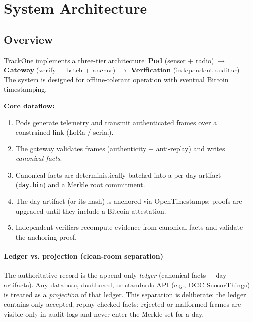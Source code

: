 \section{System Architecture}\label{sec:system-architecture}

\subsection{Overview}\label{subsec:overview}

TrackOne implements a three-tier architecture: \textbf{Pod} (sensor + radio) $\rightarrow$ \textbf{Gateway} (verify + batch + anchor) $\rightarrow$ \textbf{Verification} (independent auditor).
The system is designed for offline-tolerant operation with eventual Bitcoin timestamping.

\textbf{Core dataflow:}
\begin{enumerate}[nosep]
\item Pods generate telemetry and transmit authenticated frames over a constrained link (\ac{LoRa} / serial).
\item The gateway validates frames (authenticity + anti-replay) and writes \emph{canonical facts}.
\item Canonical facts are deterministically batched into a per-day artifact (\texttt{day.bin}) and a Merkle root commitment.
\item The day artifact (or its hash) is anchored via OpenTimestamps; proofs are upgraded until they include a Bitcoin attestation.
\item Independent verifiers recompute evidence from canonical facts and validate the anchoring proof.
\end{enumerate}

\paragraph{Ledger vs. projection (clean-room separation)}
The authoritative record is the append-only \emph{ledger} (canonical facts + day artifacts).
Any database, dashboard, or standards \ac{API} (e.g., \ac{OGC} SensorThings) is treated as a \emph{projection} of that ledger.
This separation is deliberate: the ledger contains only accepted, replay-checked facts; rejected or malformed frames are visible only in audit logs and never enter the Merkle set for a day.


